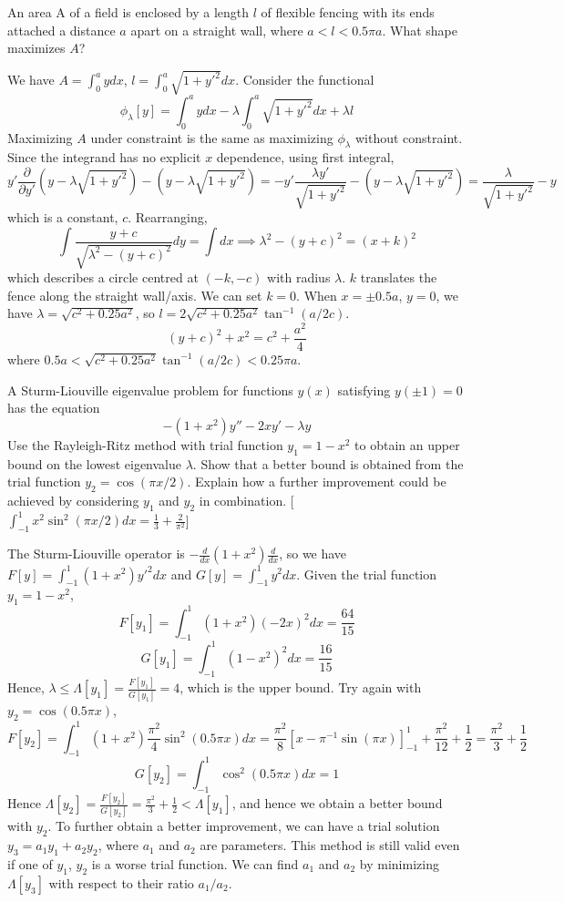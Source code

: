 \documentclass[a4paper]{article}
\begin{document}
\begin{qns}
An area A of a field is enclosed by a length $l$ of flexible fencing with its ends attached a distance $a$ apart on a straight wall, where $a<l<0.5\pi a$. What shape maximizes $A$?
\end{qns}
\begin{ans}
We have $A=\int_0^aydx$, $l=\int_0^a\sqrt{1+y'^2}dx$. Consider the functional
$$\phi_\lambda[y]=\int_0^aydx-\lambda\int_0^a\sqrt{1+y'^2}dx+\lambda l$$
Maximizing $A$ under constraint is the same as maximizing $\phi_\lambda$ without constraint. Since the integrand has no explicit $x$ dependence, using first integral,
$$y'\frac{\partial}{\partial y'}(y-\lambda\sqrt{1+y'^2})-(y-\lambda\sqrt{1+y'^2})=-y'\frac{\lambda y'}{\sqrt{1+y'^2}}-(y-\lambda\sqrt{1+y'^2})=\frac{\lambda}{\sqrt{1+y'^2}}-y$$
which is a constant, $c$. Rearranging, 
$$\int\frac{y+c}{\sqrt{\lambda^2-(y+c)^2}}dy=\int dx\implies\lambda^2-(y+c)^2=(x+k)^2$$
which describes a circle centred at $(-k,-c)$ with radius $\lambda$. $k$ translates the fence along the straight wall/axis. We can set $k=0$. When $x=\pm0.5a$, $y=0$, we have $\lambda=\sqrt{c^2+0.25a^2}$, so $l=2\sqrt{c^2+0.25a^2}\tan^{-1}(a/2c)$.
$$(y+c)^2+x^2=c^2+\frac{a^2}{4}$$
where $0.5a<\sqrt{c^2+0.25a^2}\tan^{-1}(a/2c)<0.25\pi a$.
\end{ans}
\newpage
\begin{qns}
A Sturm-Liouville eigenvalue problem for functions $y(x)$ satisfying $y(\pm1)=0$ has the equation
$$-(1+x^2)y''-2xy'-\lambda y$$
Use the Rayleigh-Ritz method with trial function $y_1=1-x^2$ to obtain an upper bound on the lowest eigenvalue $\lambda$. Show that a better bound is obtained from the trial function $y_2=\cos(\pi x/2)$. Explain how a further improvement could be achieved by considering $y_1$ and $y_2$ in combination. [$\int_{-1}^1x^2\sin^2(\pi x/2)dx=\frac{1}{3}+\frac{2}{\pi^2}$]
\end{qns}
\begin{ans}
The Sturm-Liouville operator is $-\frac{d}{dx}(1+x^2)\frac{d}{dx}$, so we have $F[y]=\int_{-1}^1(1+x^2)y'^2dx$ and $G[y]=\int_{-1}^1y^2dx$. Given the trial function $y_1=1-x^2$,
$$F[y_1]=\int_{-1}^1(1+x^2)(-2x)^2dx=\frac{64}{15}$$
$$G[y_1]=\int_{-1}^1(1-x^2)^2dx=\frac{16}{15}$$
Hence, $\lambda\leq\Lambda[y_1]=\frac{F[y_1]}{G[y_1]}=4$, which is the upper bound. Try again with $y_2=\cos(0.5\pi x)$,
$$F[y_2]=\int_{-1}^1(1+x^2)\frac{\pi^2}{4}\sin^2(0.5\pi x)dx=\frac{\pi^2}{8}[x-\pi^{-1}\sin(\pi x)]_{-1}^1+\frac{\pi^2}{12}+\frac{1}{2}=\frac{\pi^2}{3}+\frac{1}{2}$$
$$G[y_2]=\int_{-1}^1\cos^2(0.5\pi x)dx=1$$
Hence $\Lambda[y_2]=\frac{F[y_2]}{G[y_2]}=\frac{\pi^2}{3}+\frac{1}{2}<\Lambda[y_1]$, and hence we obtain a better bound with $y_2$. To further obtain a better improvement, we can have a trial solution $y_3=a_1y_1+a_2y_2$, where $a_1$ and $a_2$ are parameters. This method is still valid even if one of $y_1$, $y_2$ is a worse trial function. We can find $a_1$ and $a_2$ by minimizing $\Lambda[y_3]$ with respect to their ratio $a_1/a_2$.
\end{ans}
\end{document}
